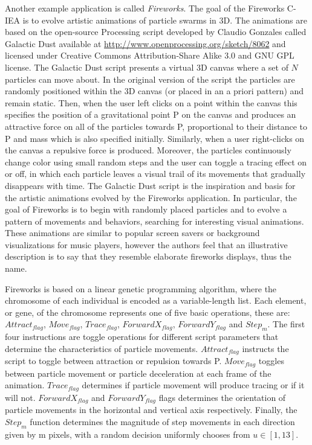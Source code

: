 \documentclass{sig-alternate}
\begin{document}
Another example application is called \emph{Fireworks}. The goal of the Fireworks C-IEA is to evolve artistic animations of particle swarms in 3D. The animations are based on the open-source Processing script developed by Claudio Gonzales called Galactic Dust available at \url{http://www.openprocessing.org/sketch/8062} and
licensed under Creative Commons Attribution-Share Alike 3.0 and GNU GPL license. The Galactic Dust script presents a virtual 3D canvas where a set of $N$ particles can move
about. In the original version of the script the particles are
randomly positioned within the 3D canvas (or placed in an
a priori pattern) and remain static. Then, when the user left clicks
on a point within the canvas this specifies the position
of a gravitational point P on the canvas and produces an
attractive force on all of the particles towards P, proportional
to their distance to P and mass which is also specified initially.
Similarly, when a user right-clicks on the canvas a repulsive
force is produced. Moreover, the particles continuously change
color using small random steps and the user can toggle a
tracing effect on or off, in which each particle leaves a visual
trail of its movements that gradually disappears with time.
The Galactic Dust script is the inspiration and basis for
the artistic animations evolved by the Fireworks application.
In particular, the goal of Fireworks is to begin with randomly
placed particles and to evolve a pattern of movements and
behaviors, searching for interesting visual animations. These
animations are similar to popular screen savers or background
visualizations for music players, however the authors feel that
an illustrative description is to say that they resemble elaborate
fireworks displays, thus the name.

Fireworks is based on a linear genetic programming algorithm, where the chromosome of each individual
is encoded as a variable-length list. Each element,
or gene, of the chromosome represents one of five basic
operations, these are: $Attract_{flag}$, $Move_{flag}$, $Trace_{flag}$,
$ForwardX_{flag}$, $ForwardY_{flag}$ and $Step_{m}$. The first four
instructions are toggle operations for different script parameters
that determine the characteristics of particle movements.
$Attract_{flag}$ instructs the script to toggle between attraction
or repulsion towards P. $Move_{flag}$ toggles between particle
movement or particle deceleration at each frame of the animation.
$Trace_{flag}$ determines if particle movement will produce
tracing or if it will not. $ForwardX_{flag}$ and $ForwardY_{flag}$
flags determines the orientation of particle movements in the
horizontal and vertical axis respectively. Finally, the $Step_{m}$
function determines the magnitude of step movements in each
direction given by m pixels, with a random decision uniformly
chooses from $u \in [1, 13]$.
\end{document}
